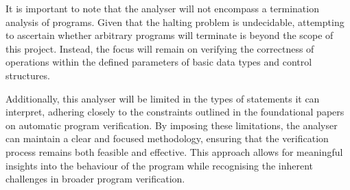 \documentclass[11pt,a4paper]{article}
\begin{document}
It is important to note that the analyser will not encompass a termination analysis of programs. Given that the halting problem is undecidable, attempting to ascertain whether arbitrary programs will terminate is beyond the scope of this project. Instead, the focus will remain on verifying the correctness of operations within the defined parameters of basic data types and control structures.

Additionally, this analyser will be limited in the types of statements it can interpret, adhering closely to the constraints outlined in the foundational papers on automatic program verification. By imposing these limitations, the analyser can maintain a clear and focused methodology, ensuring that the verification process remains both feasible and effective. This approach allows for meaningful insights into the behaviour of the program while recognising the inherent challenges in broader program verification.

\pagebreak
\end{document}
